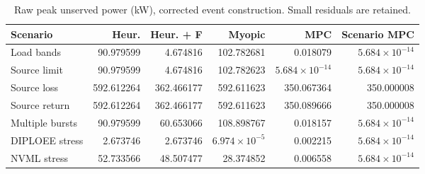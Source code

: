 \begin{table}[t]
\centering
\small
\caption{Raw peak unserved power (kW), corrected event construction. Small residuals are retained.}
\begin{tabular}{lrrrrr}
\hline
Scenario & Heur. & Heur. + F & Myopic & MPC & Scenario MPC \\
\hline
Load bands & 90.979599 & 4.674816 & 102.782681 & 0.018079 & $5.684\times10^{-14}$ \\
Source limit & 90.979599 & 4.674816 & 102.782623 & $5.684\times10^{-14}$ & $5.684\times10^{-14}$ \\
Source loss & 592.612264 & 362.466177 & 592.611623 & 350.067364 & 350.000008 \\
Source return & 592.612264 & 362.466177 & 592.611623 & 350.089666 & 350.000008 \\
Multiple bursts & 90.979599 & 60.653066 & 108.898767 & 0.018157 & $5.684\times10^{-14}$ \\
DIPLOEE stress & 2.673746 & 2.673746 & $6.974\times10^{-5}$ & 0.002215 & $5.684\times10^{-14}$ \\
NVML stress & 52.733566 & 48.507477 & 28.374852 & 0.006558 & $5.684\times10^{-14}$ \\
\hline
\end{tabular}
\end{table}
